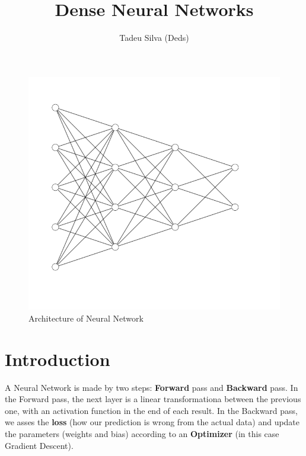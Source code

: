 \documentclass[12pt]{article}
\title{Dense Neural Networks}
\author{Tadeu Silva (Deds)}
\begin{document}
\maketitle

\begin{figure}[H]
    \centering
    \includegraphics[width=0.9\linewidth]{images/NN.png}
    \caption{Architecture of Neural Network}
    \label{fig1}
\end{figure}   

\newpage

\section{Introduction}
A Neural Network is made by two steps: \textbf{Forward} pass and \textbf{Backward} pass. In the Forward pass, the next layer is a linear transformationa between the previous one, with an activation function in the end of each result. In the Backward pass, we asses the \textbf{loss} (how our prediction is wrong from the actual data) and update the parameters (weights and bias) according to an \textbf{Optimizer} (in this case Gradient Descent).
\end{document}
